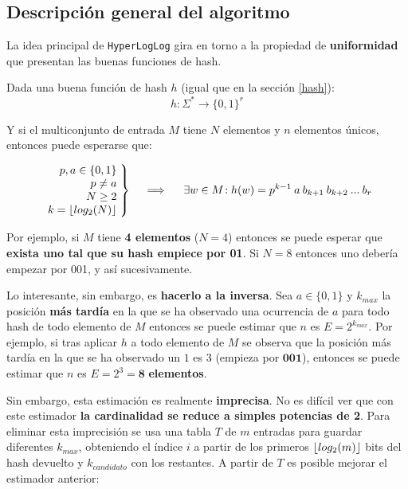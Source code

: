 \subsection{Descripción general del algoritmo}
La idea principal de \texttt{HyperLogLog} gira en torno a la propiedad de \textbf{uniformidad} que presentan las buenas
funciones de hash.

Dada una buena función de hash $h$ (igual que en la sección \ref{hash}):
$$h: \Sigma^* \rightarrow \{0,1\}^r$$

Y si el multiconjunto de entrada $M$ tiene $N$ elementos y $n$ elementos únicos, entonces puede esperarse que:

\begin{align*}
  \left.\begin{array}{r@{\mskip\thickmuskip}l}
    p, a \in \{0, 1\} \\
    p \neq a \\
    N \geq 2 \\
    k = \floor{log_2(N)}
  \end{array} \right\}
  \quad \implies \quad
  \left.
    \exists{w \in M}\!: h(w) = p^{k-1} \: a \: b_{k+1} \: b_{k+2} \: ... \: b_r
  \right.
\end{align*}

Por ejemplo, si $M$ tiene \textbf{4 elementos} ($N = 4$) entonces se puede esperar que \textbf{exista uno tal que su hash
empiece por 01}. Si $N = 8$ entonces uno debería empezar por 001, y así sucesivamente.

Lo interesante, sin embargo, es \textbf{hacerlo a la inversa}.
Sea $a \in \{0, 1\}$ y $k_{max}$ la posición \textbf{más tardía} en la que se ha observado
una ocurrencia de $a$ para todo hash de todo elemento de $M$ entonces se puede estimar que $n$ es $E = 2^{k_{max}}$.
Por ejemplo, si tras aplicar $h$ a todo elemento de $M$ se observa que la posición más tardía en la que se ha observado un
$1$ es 3 (empieza por $\textbf{001}$), entonces se puede estimar que $n$ es $E = 2^3 = \textbf{8}$ \textbf{elementos}.

Sin embargo, esta estimación es realmente \textbf{imprecisa}. No es difícil ver que con este estimador
\textbf{la cardinalidad se reduce a simples potencias de 2}. Para eliminar esta imprecisión se usa una tabla $T$ de $m$ entradas
para guardar diferentes $k_{max}$, obteniendo el índice $i$ a partir de los primeros $\lfloor log_2(m)\rfloor$ bits del hash devuelto
y $k_{candidato}$ con los restantes. A partir de $T$ es posible mejorar el estimador anterior:

